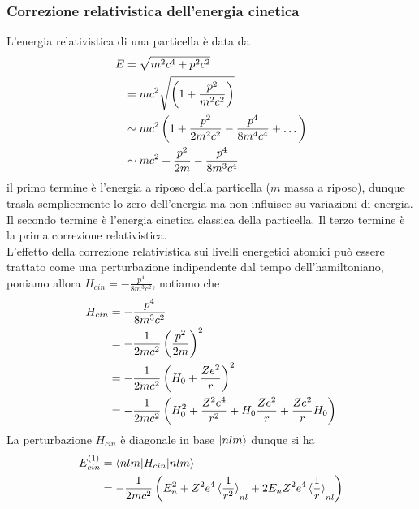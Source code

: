 \documentclass{article}
\begin{document}
\subsubsection{Correzione relativistica dell'energia cinetica}
L'energia relativistica di una particella è data da
\begin{align}
    E &= \sqrt{m^2c^4 + p^2c^2} \notag \\
    &= mc^2\sqrt{\left( 1 + \frac{p^2}{m^2c^2} \right)} \notag \\
    &\sim mc^2\left( 1 + \frac{p^2}{2m^2c^2} - \frac{p^4}{8m^4c^4} + \dots \right) \notag \\
    &\sim mc^2 + \frac{p^2}{2m} - \frac{p^4}{8m^3c^4} \notag
\end{align}
il primo termine è l'energia a riposo della particella ($m$ massa a riposo), dunque trasla semplicemente lo zero dell'energia ma non influisce su variazioni di energia. Il secondo termine è l'energia cinetica classica della particella. Il terzo termine è la prima correzione relativistica. \\
L'effetto della correzione relativistica sui livelli energetici atomici può essere trattato come una perturbazione indipendente dal tempo dell'hamiltoniano, poniamo allora $H_{cin} = -\frac{p^4}{8m^3c^2}$, notiamo che
\begin{align}
    H_{cin} &= -\frac{p^4}{8m^3c^2} \notag \\
    &= -\frac{1}{2mc^2}\left( \frac{p^2}{2m} \right)^2 \notag \\
    &= -\frac{1}{2mc^2}\left( H_0 + \frac{Ze^2}{r} \right)^2 \notag \\
    &= -\frac{1}{2mc^2}\left( H_0^2 + \frac{Z^2e^4}{r^2} + H_0\frac{Ze^2}{r} + \frac{Ze^2}{r}H_0 \right) \notag
\end{align}
La perturbazione $H_{cin}$ è diagonale in base $\ket{nlm}$ dunque si ha
\begin{align}
    E_{cin}^{(1)} &= \braket{nlm|H_{cin}|nlm} \notag \\
    &= -\frac{1}{2mc^2}\left( E_n^2 + Z^2e^4\braket{\frac{1}{r^2}}_{nl} + 2E_nZ^2e^4\braket{\frac{1}{r}}_{nl} \right) \notag
\end{align}
\end{document}
